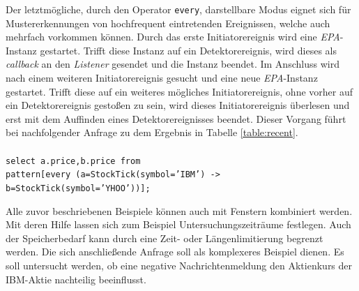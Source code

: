 \documentclass{acm_proc_article-sp}
\begin{document}
Der letztmögliche, durch den Operator \texttt{every}, darstellbare Modus eignet sich für 
Mustererkennungen von hochfrequent eintretenden 
Ereignissen, welche auch mehrfach vorkommen können. Durch das erste Initiatorereignis 
wird eine \textit{EPA}-Instanz gestartet. Trifft diese Instanz auf ein Detektorereignis, 
wird dieses als \textit{callback} an den \textit{Listener} gesendet und die Instanz 
beendet. Im Anschluss wird nach einem weiteren Initiatorereignis gesucht und eine neue 
\textit{EPA}-Instanz gestartet. Trifft diese auf ein weiteres mögliches 
Initiatorereignis, ohne vorher auf ein Detektorereignis gestoßen zu sein, wird dieses
Initiatorereignis überlesen und erst mit dem Auffinden eines Detektorereignisses beendet. 
Dieser Vorgang führt bei nachfolgender Anfrage zu dem Ergebnis in Tabelle 
\ref{table:recent}.\\\\

\texttt{\texttt{select a.price,b.price from\\pattern[every (a=StockTick(symbol='IBM') ->\\
        b=StockTick(symbol='YHOO'))];}}

\begin{table}[ht]
    \caption{\textit{Regular Consumption Mode}}
    \label{table:recent}\vspace{0.2cm}
\end{table}

Alle zuvor beschriebenen Beispiele können auch mit Fenstern kombiniert werden. Mit deren 
Hilfe lassen sich zum Beispiel Untersuchungszeiträume festlegen. Auch der Speicherbedarf 
kann durch eine Zeit- oder Längenlimitierung begrenzt werden. Die sich anschließende 
Anfrage soll als komplexeres Beispiel dienen. Es soll untersucht werden, ob eine negative 
Nachrichtenmeldung den Aktienkurs der IBM-Aktie nachteilig beeinflusst.
\end{document}
